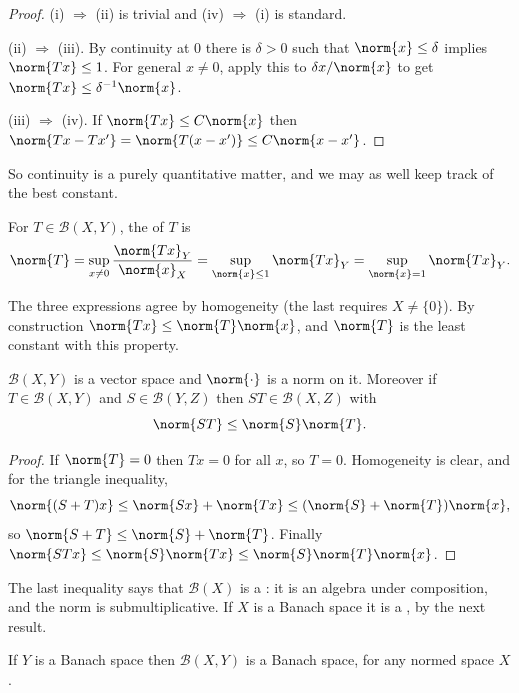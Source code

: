 \documentclass[a4paper]{scrartcl}
\newcommand{\Bop}{\mathcal{B}}
\begin{document}
\begin{proof}
	(i) $\Rightarrow$ (ii) is trivial and (iv) $\Rightarrow$ (i) is standard.

	(ii) $\Rightarrow$ (iii). By continuity at $0$ there is $\delta > 0$ such that $\norm{x} \leq \delta$ implies $\norm{Tx} \leq 1$. For general $x \neq 0$, apply this to $\delta x / \norm{x}$ to get $\norm{Tx} \leq \delta^{-1} \norm{x}$.

	(iii) $\Rightarrow$ (iv). If $\norm{Tx} \leq C\norm{x}$ then $\norm{Tx - Tx'} = \norm{T(x - x')} \leq C \norm{x - x'}$.
\end{proof}

So continuity is a purely quantitative matter, and we may as well keep track of the best constant.

\begin{definition}
	For $T \in \Bop(X,Y)$, the  of $T$ is
	$$\norm{T} = \sup_{x \neq 0} \frac{\norm{Tx}_Y}{\norm{x}_X} = \sup_{\norm{x} \leq 1} \norm{Tx}_Y = \sup_{\norm{x} = 1} \norm{Tx}_Y.$$
\end{definition}

The three expressions agree by homogeneity (the last requires $X \neq \{0\}$). By construction $\norm{Tx} \leq \norm{T}\norm{x}$, and $\norm{T}$ is the least constant with this property.

\begin{proposition}
	$\Bop(X,Y)$ is a vector space and $\norm{\cdot}$ is a norm on it. Moreover if $T \in \Bop(X,Y)$ and $S \in \Bop(Y,Z)$ then $ST \in \Bop(X,Z)$ with
	$$\norm{ST} \leq \norm{S} \norm{T}.$$
\end{proposition}

\begin{proof}
	If $\norm{T} = 0$ then $Tx = 0$ for all $x$, so $T = 0$. Homogeneity is clear, and for the triangle inequality,
	$$\norm{(S+T)x} \leq \norm{Sx} + \norm{Tx} \leq (\norm{S} + \norm{T})\norm{x},$$
	so $\norm{S+T} \leq \norm{S} + \norm{T}$. Finally $\norm{STx} \leq \norm{S}\norm{Tx} \leq \norm{S}\norm{T}\norm{x}$.
\end{proof}

The last inequality says that $\Bop(X)$ is a : it is an algebra under composition, and the norm is submultiplicative. If $X$ is a Banach space it is a , by the next result.

\begin{theorem}
	If $Y$ is a Banach space then $\Bop(X,Y)$ is a Banach space, for any normed space $X$.
\end{theorem}
\end{document}
